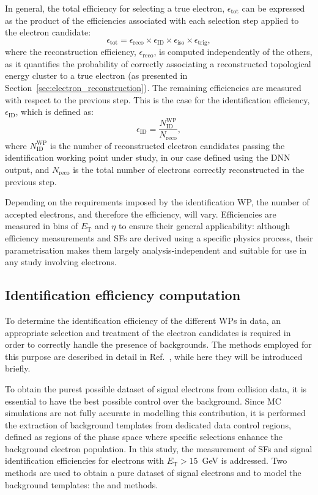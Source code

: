 In general, the total efficiency for selecting a true electron, $\epsilon_{\text{tot}}$ can be expressed as the product of the efficiencies associated with each selection step applied to the electron candidate:
\begin{equation}
  \epsilon_{\text{tot}} = \epsilon_{\text{reco}} \times \epsilon_{\text{ID}} \times \epsilon_{\text{iso}} \times \epsilon_{\text{trig}},
\end{equation}
where the reconstruction efficiency, $\epsilon_{\text{reco}}$, is computed independently of the others, as it quantifies the probability of correctly associating a reconstructed topological energy cluster to a true electron (as presented in Section~\ref{sec:electron_reconstruction}). The remaining efficiencies are measured with respect to the previous step. This is the case for the identification efficiency, $\epsilon_{\text{ID}}$, which is defined as:
\begin{equation}
  \epsilon_{\text{ID}} = \frac{N^{\text{WP}}_{\text{ID}}}{N_{\text{reco}}},
\label{eq:id_eff}  
\end{equation}
where $N^{\text{WP}}_{\text{ID}}$ is the number of reconstructed electron candidates passing the identification working point under study, in our case defined using the DNN output, and $N_{\text{reco}}$ is the total number of electrons correctly reconstructed in the previous step.

Depending on the requirements imposed by the identification WP, the number of accepted electrons, and therefore the efficiency, will vary. Efficiencies are measured in bins of $E_{\text{T}}$ and $\eta$ to ensure their general applicability: although efficiency measurements and SFs are derived using a specific physics process, their parametrisation makes them largely analysis-independent and suitable for use in any study involving electrons.

\subsection{Identification efficiency computation}
To determine the identification efficiency of the different WPs in data, an appropriate selection and treatment of the electron candidates is required in order to correctly handle the presence of backgrounds. The methods employed for this purpose are described in detail in Ref.~\cite{latest_electron_paper_2024}, while here they will be introduced briefly.

To obtain the purest possible dataset of signal electrons from collision data, it is essential to have the best possible control over the background. Since MC simulations are not fully accurate in modelling this contribution, it is performed the extraction of background templates from dedicated data control regions, defined as regions of the phase space where specific selections enhance the background electron population. In this study, the measurement of SFs and signal identification efficiencies for electrons with $E_{\mathrm{T}} > 15$~GeV is addressed. Two methods are used to obtain a pure dataset of signal electrons and to model the background templates: the \zmass and \ziso methods.

